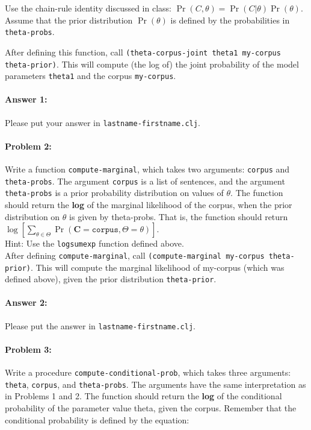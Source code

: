 \documentclass[10pt]{article}
\begin{document}
Use the chain-rule identity discussed in class:
$\Pr(C,\theta) = \Pr(C|\theta)\Pr(\theta)$. Assume that the prior
distribution $\Pr(\theta)$ is defined by the probabilities in
\texttt{theta-probs}.

After defining this function, call \texttt{(theta-corpus-joint theta1
  my-corpus theta-prior)}. This will compute (the log of) the joint
probability of the model parameters \texttt{theta1} and the corpus
\texttt{my-corpus}.

\paragraph{Answer 1:} Please put your answer in \texttt{lastname-firstname.clj}.

\hrulefill
\paragraph{Problem 2:}

Write a function \texttt{compute-marginal}, which takes two arguments:
\texttt{corpus} and \texttt{theta-probs}. The argument \texttt{corpus}
is a list of sentences, and the argument \texttt{theta-probs} is a
prior probability distribution on values of $\theta$. The function
should return the \textbf{log} of the marginal likelihood of the
corpus, when the prior distribution on $\theta$ is given by
theta-probs. That is, the function should return
$\log[\sum_{\theta \in \Theta} \Pr(\mathbf{C}=\texttt{corpus}, \Theta=\theta)]$.
\\

\noindent Hint: Use the \texttt{logsumexp} function defined above.
\\

\noindent After defining \texttt{compute-marginal}, call
\texttt{(compute-marginal my-corpus theta-prior)}. This will compute
the marginal likelihood of my-corpus (which was defined above), given
the prior distribution \texttt{theta-prior}.

\paragraph{Answer 2:} Please put the answer in
\texttt{lastname-firstname.clj}.

\hrulefill
\paragraph{Problem 3:}

Write a procedure \texttt{compute-conditional-prob}, which takes three
arguments: \texttt{theta}, \texttt{corpus}, and
\texttt{theta-probs}. The arguments have the same interpretation as in
Problems 1 and 2. The function should return the \textbf{log} of the
conditional probability of the parameter value theta, given the
corpus. Remember that the conditional probability is defined by the
equation:
\end{document}
